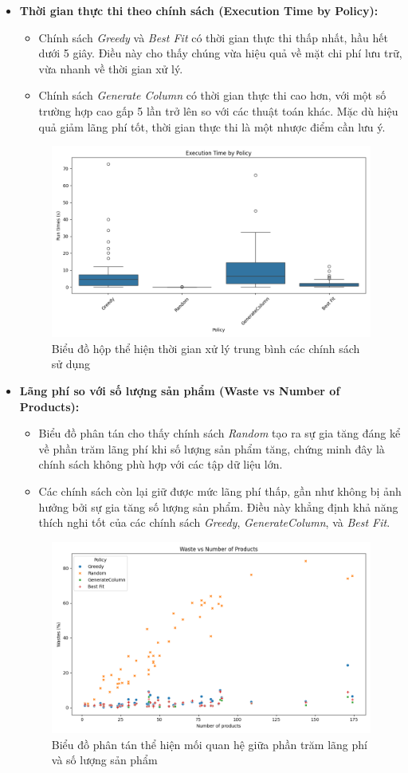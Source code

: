 \begin{itemize}
    \item \textbf{Thời gian thực thi theo chính sách (Execution Time by Policy):}
    \begin{itemize}
        \item Chính sách \textit{Greedy} và \textit{Best Fit} có thời gian thực thi thấp nhất, hầu hết dưới 5 giây. Điều này cho thấy chúng vừa hiệu quả về mặt chi phí lưu trữ, vừa nhanh về thời gian xử lý.
        \item Chính sách \textit{Generate Column} có thời gian thực thi cao hơn, với một số trường hợp cao gấp 5 lần trở lên so với các thuật toán khác. Mặc dù hiệu quả giảm lãng phí tốt, thời gian thực thi là một nhược điểm cần lưu ý.
    \end{itemize}
    \begin{figure}[!htp]
        \centering
        \includegraphics[width=0.5\linewidth]{Images/execution_time_comparison.png}
        \caption{Biểu đồ hộp thể hiện thời gian xử lý trung bình các chính sách sử dụng}
        \label{fig:time}
    \end{figure}
    
    \item \textbf{Lãng phí so với số lượng sản phẩm (Waste vs Number of Products):}
    \begin{itemize}
        \item Biểu đồ phân tán cho thấy chính sách \textit{Random} tạo ra sự gia tăng đáng kể về phần trăm lãng phí khi số lượng sản phẩm tăng, chứng minh đây là chính sách không phù hợp với các tập dữ liệu lớn.
        \item Các chính sách còn lại giữ được mức lãng phí thấp, gần như không bị ảnh hưởng bởi sự gia tăng số lượng sản phẩm. Điều này khẳng định khả năng thích nghi tốt của các chính sách \textit{Greedy}, \textit{GenerateColumn}, và \textit{Best Fit}.
    \end{itemize}
    \begin{figure}[!htp]
        \centering
        \includegraphics[width=0.5\linewidth]{Images/waste_vs_products.png}
        \caption{Biểu đồ phân tán thể hiện mối quan hệ giữa phần trăm lãng phí và số lượng sản phẩm}
        \label{fig:time}
    \end{figure}
\end{itemize}

